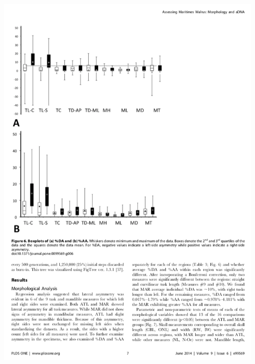 \documentclass[10pt]{beamer}
\begin{document}
\begin{frame}
	\begin{columns}
		\begin{column}{0.5\textwidth}
			\begin{center}
				\includegraphics[width=1.0\textwidth]{figures/paper3.png}
			\end{center}
		\end{column}
		

\end{columns}
\end{frame}
\end{document}
